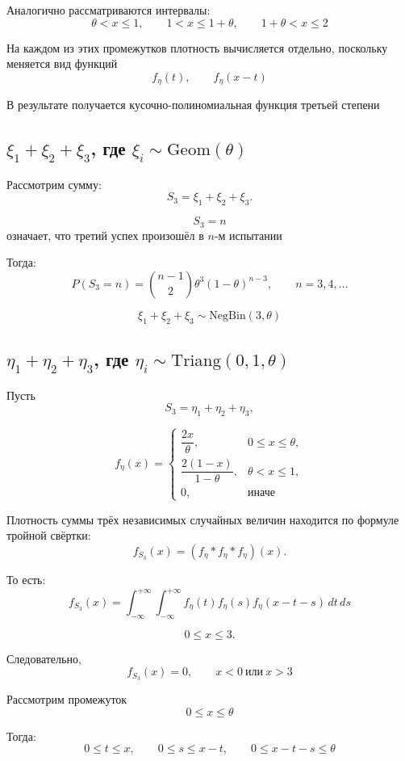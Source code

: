 \documentclass[12pt,a4paper]{article}
\theoremstyle{definition}
\begin{document}
Аналогично рассматриваются интервалы:
\[\theta<x\le1,
\qquad
1<x\le1+\theta,
\qquad
1+\theta<x\le2\]

На каждом из этих промежутков плотность вычисляется отдельно, поскольку меняется вид функций
\[f_\eta(t), \qquad f_\eta(x-t)\]

В результате получается кусочно-полиномиальная функция третьей степени



\subsection{\texorpdfstring
{$\xi_1+\xi_2+\xi_3$, где $\xi_i\sim \mathrm{Geom}(\theta)$}
{xi1+xi2+xi3, где xi_i ~ Geom(theta)}}

Рассмотрим сумму:
\[S_3=\xi_1+\xi_2+\xi_3.\]

\[S_3=n\]
означает, что третий успех произошёл в $n$-м испытании

Тогда:
\[P(S_3=n)
=
\binom{n-1}{2}
\theta^3(1-\theta)^{n-3},
\qquad n=3,4,\dots\]

\[\boxed{
\xi_1+\xi_2+\xi_3\sim
\mathrm{NegBin}(3,\theta)}\]

\subsection{\texorpdfstring
{$\eta_1+\eta_2+\eta_3$, где $\eta_i\sim \mathrm{Triang}(0,1,\theta)$}
{eta1+eta2+eta3, где eta_i ~ Triang(0,1,theta)}}

Пусть
\[S_3=\eta_1+\eta_2+\eta_3,\]

\[
f_\eta(x)=
\begin{cases}
\dfrac{2x}{\theta}, & 0\le x\le\theta,\\[1ex]
\dfrac{2(1-x)}{1-\theta}, & \theta<x\le1,\\[1ex]
0, & \text{иначе}
\end{cases}
\]

Плотность суммы трёх независимых случайных величин находится по формуле тройной свёртки:
\[
f_{S_3}(x)=
(f_\eta*f_\eta*f_\eta)(x).\]

То есть:
\[
f_{S_3}(x)
=
\int_{-\infty}^{+\infty}
\int_{-\infty}^{+\infty}
f_\eta(t)
f_\eta(s)
f_\eta(x-t-s)
\,dt\,ds\] 

\[0\le x\le3.\]

Следовательно,
\[f_{S_3}(x)=0,\qquad x<0 \ \text{или}\ x>3\]

Рассмотрим промежуток
\[0\le x\le\theta\]

Тогда:
\[0\le t\le x,\qquad
0\le s\le x-t,\qquad
0\le x-t-s\le\theta\]
\end{document}
